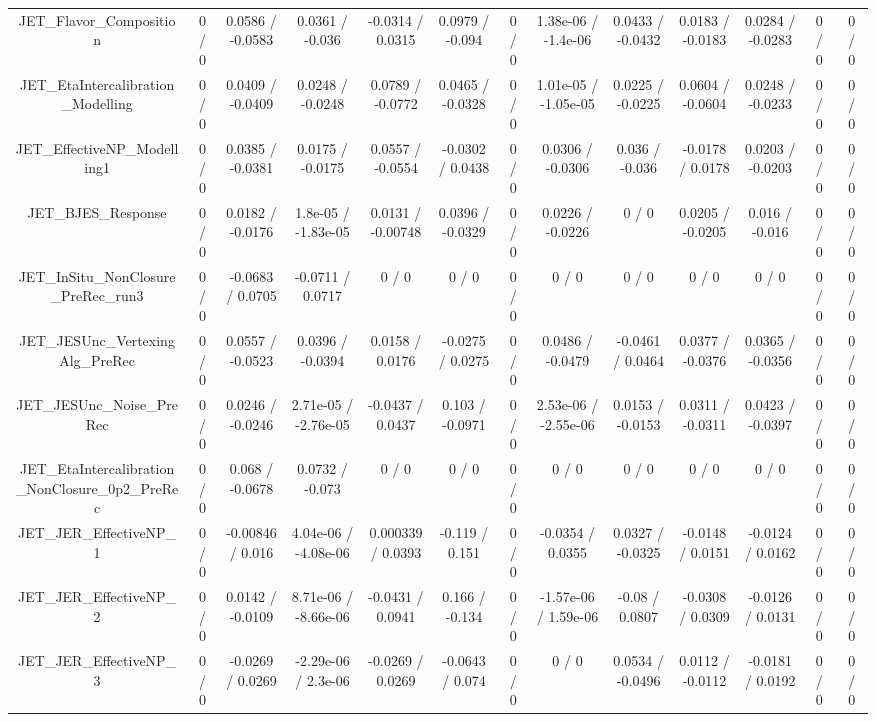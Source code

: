 \documentclass[10pt]{article}
\begin{document}
\begin{table}[htbp]
\begin{center}
\begin{tabular}{|c|c|c|c|c|c|c|c|c|c|c|c|c|}
  JET_Flavor_Composition & 0 / 0 & 0.0586 / -0.0583 & 0.0361 / -0.036 & -0.0314 / 0.0315 & 0.0979 / -0.094 & 0 / 0 & 1.38e-06 / -1.4e-06 & 0.0433 / -0.0432 & 0.0183 / -0.0183 & 0.0284 / -0.0283 & 0 / 0 & 0 / 0 \\ 
  JET_EtaIntercalibration_Modelling & 0 / 0 & 0.0409 / -0.0409 & 0.0248 / -0.0248 & 0.0789 / -0.0772 & 0.0465 / -0.0328 & 0 / 0 & 1.01e-05 / -1.05e-05 & 0.0225 / -0.0225 & 0.0604 / -0.0604 & 0.0248 / -0.0233 & 0 / 0 & 0 / 0 \\ 
  JET_EffectiveNP_Modelling1 & 0 / 0 & 0.0385 / -0.0381 & 0.0175 / -0.0175 & 0.0557 / -0.0554 & -0.0302 / 0.0438 & 0 / 0 & 0.0306 / -0.0306 & 0.036 / -0.036 & -0.0178 / 0.0178 & 0.0203 / -0.0203 & 0 / 0 & 0 / 0 \\ 
  JET_BJES_Response & 0 / 0 & 0.0182 / -0.0176 & 1.8e-05 / -1.83e-05 & 0.0131 / -0.00748 & 0.0396 / -0.0329 & 0 / 0 & 0.0226 / -0.0226 & 0 / 0 & 0.0205 / -0.0205 & 0.016 / -0.016 & 0 / 0 & 0 / 0 \\ 
  JET_InSitu_NonClosure_PreRec_run3 & 0 / 0 & -0.0683 / 0.0705 & -0.0711 / 0.0717 & 0 / 0 & 0 / 0 & 0 / 0 & 0 / 0 & 0 / 0 & 0 / 0 & 0 / 0 & 0 / 0 & 0 / 0 \\ 
  JET_JESUnc_VertexingAlg_PreRec & 0 / 0 & 0.0557 / -0.0523 & 0.0396 / -0.0394 & 0.0158 / 0.0176 & -0.0275 / 0.0275 & 0 / 0 & 0.0486 / -0.0479 & -0.0461 / 0.0464 & 0.0377 / -0.0376 & 0.0365 / -0.0356 & 0 / 0 & 0 / 0 \\ 
  JET_JESUnc_Noise_PreRec & 0 / 0 & 0.0246 / -0.0246 & 2.71e-05 / -2.76e-05 & -0.0437 / 0.0437 & 0.103 / -0.0971 & 0 / 0 & 2.53e-06 / -2.55e-06 & 0.0153 / -0.0153 & 0.0311 / -0.0311 & 0.0423 / -0.0397 & 0 / 0 & 0 / 0 \\ 
  JET_EtaIntercalibration_NonClosure_0p2_PreRec & 0 / 0 & 0.068 / -0.0678 & 0.0732 / -0.073 & 0 / 0 & 0 / 0 & 0 / 0 & 0 / 0 & 0 / 0 & 0 / 0 & 0 / 0 & 0 / 0 & 0 / 0 \\ 
  JET_JER_EffectiveNP_1 & 0 / 0 & -0.00846 / 0.016 & 4.04e-06 / -4.08e-06 & 0.000339 / 0.0393 & -0.119 / 0.151 & 0 / 0 & -0.0354 / 0.0355 & 0.0327 / -0.0325 & -0.0148 / 0.0151 & -0.0124 / 0.0162 & 0 / 0 & 0 / 0 \\ 
  JET_JER_EffectiveNP_2 & 0 / 0 & 0.0142 / -0.0109 & 8.71e-06 / -8.66e-06 & -0.0431 / 0.0941 & 0.166 / -0.134 & 0 / 0 & -1.57e-06 / 1.59e-06 & -0.08 / 0.0807 & -0.0308 / 0.0309 & -0.0126 / 0.0131 & 0 / 0 & 0 / 0 \\ 
  JET_JER_EffectiveNP_3 & 0 / 0 & -0.0269 / 0.0269 & -2.29e-06 / 2.3e-06 & -0.0269 / 0.0269 & -0.0643 / 0.074 & 0 / 0 & 0 / 0 & 0.0534 / -0.0496 & 0.0112 / -0.0112 & -0.0181 / 0.0192 & 0 / 0 & 0 / 0 \\ 

\end{tabular}
\end{center}
\end{table}
\end{document}
